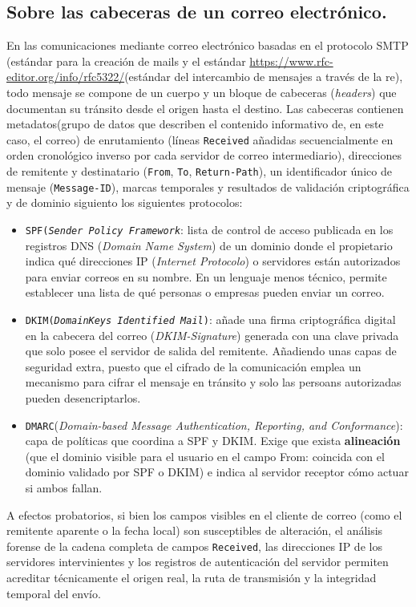 \subsection{Sobre las cabeceras de un correo electrónico.}
En las comunicaciones mediante correo electrónico basadas en el protocolo SMTP (estándar para la creación de mails y el estándar \href{RFC 5322}{https://www.rfc-editor.org/info/rfc5322/}(estándar del intercambio de mensajes a través de la re), todo mensaje se compone de un cuerpo y un bloque de cabeceras (\textit{headers}) que documentan su tránsito desde el origen hasta el destino. Las cabeceras contienen metadatos(grupo de datos que describen el contenido informativo de, en este caso, el correo) de enrutamiento (líneas \texttt{Received} añadidas secuencialmente en orden cronológico inverso por cada servidor de correo intermediario), direcciones de remitente y destinatario (\texttt{From}, \texttt{To}, \texttt{Return-Path}), un identificador único de mensaje (\texttt{Message-ID}), marcas temporales y resultados de validación criptográfica y de dominio siguiento los siguientes protocolos:
\begin{itemize}
	\item \texttt{SPF(\textit{Sender Policy Framework}}: lista de control de acceso publicada en los registros DNS (\textit{Domain Name System}) de un dominio donde el propietario indica qué direcciones IP (\textit{Internet Protocolo}) o servidores están autorizados para enviar correos en su nombre. En un lenguaje menos técnico, permite establecer una lista de qué personas o empresas pueden enviar un correo.
	\item  \texttt{DKIM(\textit{DomainKeys Identified Mail})}: añade una firma criptográfica digital en la cabecera del correo (\textit{DKIM-Signature}) generada con una clave privada que solo posee el servidor de salida del remitente. Añadiendo unas capas de seguridad extra, puesto que el cifrado de la comunicación emplea un mecanismo para cifrar el mensaje en tránsito y solo las persoans autorizadas pueden desencriptarlos.
	\item  \texttt{DMARC}(\textit{Domain-based Message Authentication, Reporting, and Conformance}): capa de políticas que coordina a SPF y DKIM. Exige que exista \textbf{alineación} (que el dominio visible para el usuario en el campo From: coincida con el dominio validado por SPF o DKIM) e indica al servidor receptor cómo actuar si ambos fallan.
\end{itemize}

A efectos probatorios, si bien los campos visibles en el cliente de correo (como el remitente aparente o la fecha local) son susceptibles de alteración, el análisis forense de la cadena completa de campos \texttt{Received}, las direcciones IP de los servidores intervinientes y los registros de autenticación del servidor permiten acreditar técnicamente el origen real, la ruta de transmisión y la integridad temporal del envío.

